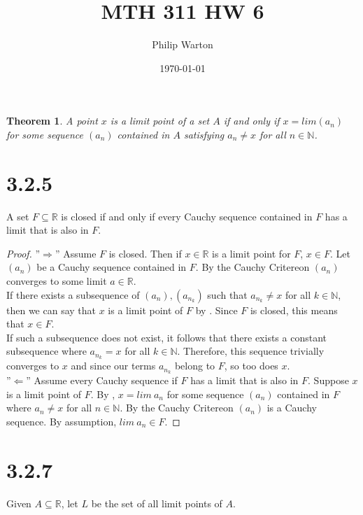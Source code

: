 \documentclass{article}
\newtheorem{theorem}{Theorem}
\begin{document}
\title{MTH 311 HW 6}
\author{Philip Warton}
\date{\today}
\maketitle


\begin{theorem}
A point $x$ is a limit point of a set $A$ if and only if $x = lim(a_n)$ for some sequence $(a_n)$ contained in $A$ satisfying $a_n \neq x$ for all $n \in \mathbb{N}$.
\end{theorem} 

\section*{3.2.5}
A set $F \subseteq \mathbb{R}$ is closed if and only if every Cauchy sequence contained in $F$ has a limit that is also in $F$.
\begin{proof}
''$\Rightarrow$'' Assume $F$ is closed. Then if $x \in \mathbb{R}$ is a limit point for $F$, $x \in F$. Let $(a_n)$ be a Cauchy sequence contained in $F$. By the Cauchy Critereon $(a_n)$ converges to some limit $a \in \mathbb{R}$. \\
 If there exists a subsequence of $(a_n), (a_{n_k})$ such that  $a_{n_k} \neq x$ for all $k \in \mathbb{N}$, then we can say that $x$ is a limit point of $F$ by . Since $F$ is closed, this means that $x \in F$.\\
 If such a subsequence does not exist, it follows that there exists a constant subsequence where $a_{n_k} = x$ for all $k \in \mathbb{N}$. Therefore, this sequence trivially converges to $x$ and since our terms $a_{n_k}$ belong to $F$, so too does $x$. \\

''$\Leftarrow$'' Assume every Cauchy sequence if $F$ has a limit that is also in $F$. Suppose $x$ is a limit point of $F$. By , $x = lim \ a_n$ for some sequence $(a_n)$ contained in $F$ where $a_n \neq x$ for all $n \in \mathbb{N}$. By the Cauchy Critereon $(a_n)$ is a Cauchy sequence. By assumption, $lim \ a_n \in F$.
\end{proof}

\section*{3.2.7}
Given $A \subseteq \mathbb{R}$, let $L$ be the set of all limit points of $A$.
\end{document}
